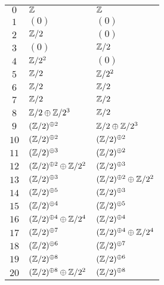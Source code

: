 \documentclass[12pt,a4paper]{article}
\begin{document}
\begin{supertabular}{|c|p{5.5cm}|p{5.5cm}|}
$0$%
&$\mathbb{Z}$%
&$\mathbb{Z}$\\

$1$%
&$(0)$%
&$(0)$\\

$2$%
&$\mathbb{Z}/2$%
&$(0)$\\

$3$%
&$(0)$%
&$\mathbb{Z}/2$\\

$4$%
&$\mathbb{Z}/2^{2}$%
&$(0)$\\

$5$%
&$\mathbb{Z}/2$%
&$\mathbb{Z}/2^{2}$\\

$6$%
&$\mathbb{Z}/2$%
&$\mathbb{Z}/2$\\

$7$%
&$\mathbb{Z}/2$%
&$\mathbb{Z}/2$\\

$8$%
&$\mathbb{Z}/2\oplus\mathbb{Z}/2^{3}$%
&$\mathbb{Z}/2$\\

$9$%
&$(\mathbb{Z}/2)^{\oplus2}$%
&$\mathbb{Z}/2\oplus\mathbb{Z}/2^{3}$\\

$10$%
&$(\mathbb{Z}/2)^{\oplus2}$%
&$(\mathbb{Z}/2)^{\oplus2}$\\

$11$%
&$(\mathbb{Z}/2)^{\oplus3}$%
&$(\mathbb{Z}/2)^{\oplus2}$\\

$12$%
&$(\mathbb{Z}/2)^{\oplus2}\oplus\mathbb{Z}/2^{2}$%
&$(\mathbb{Z}/2)^{\oplus3}$\\

$13$%
&$(\mathbb{Z}/2)^{\oplus3}$%
&$(\mathbb{Z}/2)^{\oplus2}\oplus\mathbb{Z}/2^{2}$\\

$14$%
&$(\mathbb{Z}/2)^{\oplus5}$%
&$(\mathbb{Z}/2)^{\oplus3}$\\

$15$%
&$(\mathbb{Z}/2)^{\oplus4}$%
&$(\mathbb{Z}/2)^{\oplus5}$\\

$16$%
&$(\mathbb{Z}/2)^{\oplus4}\oplus\mathbb{Z}/2^{4}$%
&$(\mathbb{Z}/2)^{\oplus4}$\\

$17$%
&$(\mathbb{Z}/2)^{\oplus7}$%
&$(\mathbb{Z}/2)^{\oplus4}\oplus\mathbb{Z}/2^{4}$\\

$18$%
&$(\mathbb{Z}/2)^{\oplus6}$%
&$(\mathbb{Z}/2)^{\oplus7}$\\

$19$%
&$(\mathbb{Z}/2)^{\oplus8}$%
&$(\mathbb{Z}/2)^{\oplus6}$\\

$20$%
&$(\mathbb{Z}/2)^{\oplus8}\oplus\mathbb{Z}/2^{2}$%
&$(\mathbb{Z}/2)^{\oplus8}$\\


\end{supertabular}
\end{document}
